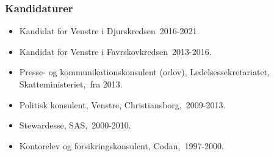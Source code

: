 \documentclass[11pt, a4paper]{awesome-cv}
\begin{document}
\begin{cvletter}
\subsubsection*{Kandidaturer}
\begin{itemize}
\item Kandidat for Venstre i Djurskredsen 2016-2021.
\item Kandidat for Venstre i Favrskovkredsen 2013-2016.
\end{itemize}
\begin{itemize}
\item Presse- og kommunikationskonsulent (orlov), Ledelsessekretariatet, Skatteministeriet, fra 2013.
\item Politisk konsulent, Venstre, Christiansborg, 2009-2013.
\item Stewardesse, SAS, 2000-2010.
\item Kontorelev og forsikringskonsulent, Codan, 1997-2000.
\end{itemize}
\end{cvletter}
\end{document}
